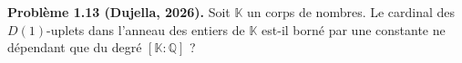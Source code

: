 \textbf{Problème 1.13 (Dujella, 2026).} Soit $\mathbb{K}$ un corps de nombres. Le cardinal des $D(1)$-uplets dans l'anneau des entiers de $\mathbb{K}$ est-il borné par une constante ne dépendant que du degré $[\mathbb{K}:\mathbb{Q}]$ ?
